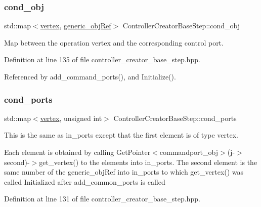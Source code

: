 \subsubsection{\texorpdfstring{cond\+\_\+obj}{cond\_obj}}
{\footnotesize\ttfamily std\+::map$<$\hyperlink{graph_8hpp_abefdcf0544e601805af44eca032cca14}{vertex}, \hyperlink{generic__obj_8hpp_acb533b2ef8e0fe72e09a04d20904ca81}{generic\+\_\+obj\+Ref}$>$ Controller\+Creator\+Base\+Step\+::cond\+\_\+obj\hspace{0.3cm}{\ttfamily [protected]}}



Map between the operation vertex and the corresponding control port. 



Definition at line 135 of file controller\+\_\+creator\+\_\+base\+\_\+step.\+hpp.



Referenced by add\+\_\+command\+\_\+ports(), and Initialize().

\mbox{\label{classControllerCreatorBaseStep_a2a6927fede489baf53ad52f8a2fd8142}} 
\subsubsection{\texorpdfstring{cond\+\_\+ports}{cond\_ports}}
{\footnotesize\ttfamily std\+::map$<$\hyperlink{graph_8hpp_abefdcf0544e601805af44eca032cca14}{vertex}, unsigned int$>$ Controller\+Creator\+Base\+Step\+::cond\+\_\+ports\hspace{0.3cm}{\ttfamily [protected]}}



This is the same as in\+\_\+ports except that the first element is of type vertex. 

Each element is obtained by calling Get\+Pointer$<$commandport\+\_\+obj$>$(j-\/$>$second)-\/$>$get\+\_\+vertex() to the elements into in\+\_\+ports. The second element is the same number of the generic\+\_\+obj\+Ref into in\+\_\+ports to which get\+\_\+vertex() was called Initialized after add\+\_\+common\+\_\+ports is called 

Definition at line 131 of file controller\+\_\+creator\+\_\+base\+\_\+step.\+hpp.



